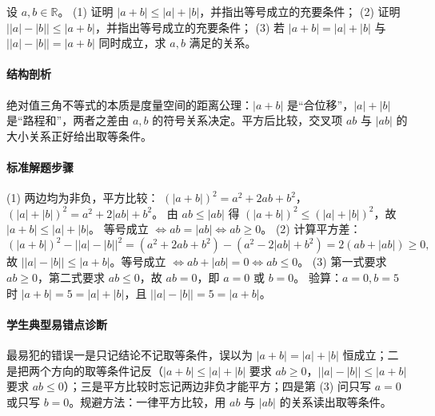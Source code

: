 \begin{problem}
设 $a,b\in\mathbb R$。
(1) 证明 $|a+b|\le|a|+|b|$，并指出等号成立的充要条件；
(2) 证明 $\bigl||a|-|b|\bigr|\le|a+b|$，并指出等号成立的充要条件；
(3) 若 $|a+b|=|a|+|b|$ 与 $\bigl||a|-|b|\bigr|=|a+b|$ 同时成立，求 $a,b$ 满足的关系。
\end{problem}
\begin{solution}
\paragraph{结构剖析}
绝对值三角不等式的本质是度量空间的距离公理：$|a+b|$ 是“合位移”，$|a|+|b|$ 是“路程和”，两者之差由 $a,b$ 的符号关系决定。平方后比较，交叉项 $ab$ 与 $|ab|$ 的大小关系正好给出取等条件。
\paragraph{标准解题步骤}
(1) 两边均为非负，平方比较：
$(|a+b|)^2=a^2+2ab+b^2$，$(|a|+|b|)^2=a^2+2|ab|+b^2$。
由 $ab\le|ab|$ 得 $(|a+b|)^2\le(|a|+|b|)^2$，故 $|a+b|\le|a|+|b|$。
等号成立 $\iff ab=|ab|\iff ab\ge0$。
(2) 计算平方差：
$$(|a+b|)^2-\bigl||a|-|b|\bigr|^2
=(a^2+2ab+b^2)-(a^2-2|ab|+b^2)=2(ab+|ab|)\ge0,$$
故 $\bigl||a|-|b|\bigr|\le|a+b|$。等号成立 $\iff ab+|ab|=0\iff ab\le0$。
(3) 第一式要求 $ab\ge0$，第二式要求 $ab\le0$，故 $ab=0$，即 $a=0$ 或 $b=0$。
验算：$a=0,b=5$ 时 $|a+b|=5=|a|+|b|$，且 $\bigl||a|-|b|\bigr|=5=|a+b|$。
\paragraph{学生典型易错点诊断}
最易犯的错误一是只记结论不记取等条件，误以为 $|a+b|=|a|+|b|$ 恒成立；二是把两个方向的取等条件记反（$|a+b|\le|a|+|b|$ 要求 $ab\ge0$，$\bigl||a|-|b|\bigr|\le|a+b|$ 要求 $ab\le0$）；三是平方比较时忘记两边非负才能平方；四是第 (3) 问只写 $a=0$ 或只写 $b=0$。规避方法：一律平方比较，用 $ab$ 与 $|ab|$ 的关系读出取等条件。
\end{solution}

